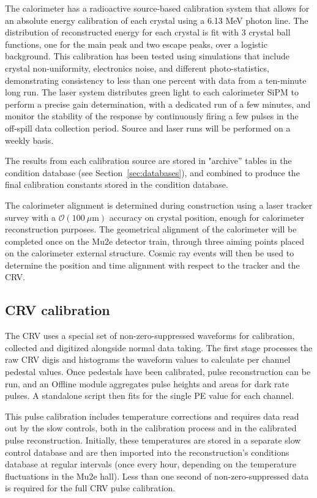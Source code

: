 The calorimeter has a radioactive source-based calibration system that allows for an absolute energy calibration of each crystal using a 6.13 MeV photon line. The distribution of reconstructed energy for each crystal is fit with 3 crystal ball functions, one for the main peak and two escape peaks, over a logistic background. This calibration has been tested using simulations that include crystal non-uniformity, electronics noise, and different photo-statistics, demonstrating consistency to less than one percent with data from a ten-minute long run. The laser system distributes green light to each calorimeter SiPM to perform a precise gain determination, with a dedicated run of a few minutes, and monitor the stability of the response by continuously firing a few pulses in the off-spill data collection period. Source and laser runs will be performed on a weekly basis.

The results from each calibration source are stored in "archive'' tables in the condition database (see Section~\ref{sec:databases}), and combined to produce the final calibration constants stored in the condition database. 

The calorimeter alignment is determined during construction using a laser tracker survey with a $\mathcal{O}(100\ \mu \text{m})$ accuracy on crystal position, enough for calorimeter reconstruction purposes. The geometrical alignment of the calorimeter will be completed once on the Mu2e detector train, through three aiming points placed on the calorimeter external structure. Cosmic ray events will then be used to determine the position and time alignment with respect to the tracker and the CRV.

\subsection{CRV calibration}

The CRV uses a special set of non-zero-suppressed waveforms for calibration, collected and digitized alongside normal data taking. The first stage processes the raw CRV digis and histograms the waveform values to calculate per channel pedestal values. Once pedestals have been calibrated, pulse reconstruction can be run, and an Offline module aggregates pulse heights and areas for dark rate pulses. A standalone script then fits for the single PE value for each channel.

This pulse calibration includes temperature corrections and requires data read out by the slow controls, both in the calibration process and in the calibrated pulse reconstruction. Initially, these temperatures are stored in a separate slow control database and are then imported into the reconstruction's conditions database at regular intervals (once every hour, depending on the temperature fluctuations in the Mu2e hall). Less than one second of non-zero-suppressed data is required for the full CRV pulse calibration.

